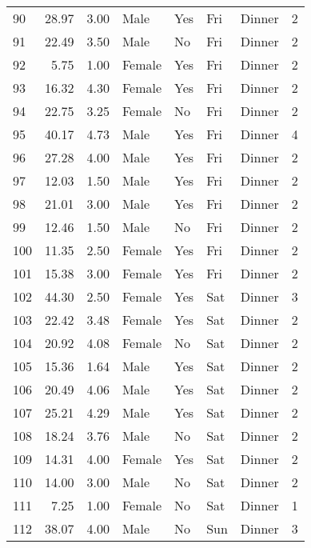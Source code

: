 \begin{tabular}{lrrllllr}
90  &       28.97 &   3.00 &    Male &    Yes &   Fri &  Dinner &     2 \\
91  &       22.49 &   3.50 &    Male &     No &   Fri &  Dinner &     2 \\
92  &        5.75 &   1.00 &  Female &    Yes &   Fri &  Dinner &     2 \\
93  &       16.32 &   4.30 &  Female &    Yes &   Fri &  Dinner &     2 \\
94  &       22.75 &   3.25 &  Female &     No &   Fri &  Dinner &     2 \\
95  &       40.17 &   4.73 &    Male &    Yes &   Fri &  Dinner &     4 \\
96  &       27.28 &   4.00 &    Male &    Yes &   Fri &  Dinner &     2 \\
97  &       12.03 &   1.50 &    Male &    Yes &   Fri &  Dinner &     2 \\
98  &       21.01 &   3.00 &    Male &    Yes &   Fri &  Dinner &     2 \\
99  &       12.46 &   1.50 &    Male &     No &   Fri &  Dinner &     2 \\
100 &       11.35 &   2.50 &  Female &    Yes &   Fri &  Dinner &     2 \\
101 &       15.38 &   3.00 &  Female &    Yes &   Fri &  Dinner &     2 \\
102 &       44.30 &   2.50 &  Female &    Yes &   Sat &  Dinner &     3 \\
103 &       22.42 &   3.48 &  Female &    Yes &   Sat &  Dinner &     2 \\
104 &       20.92 &   4.08 &  Female &     No &   Sat &  Dinner &     2 \\
105 &       15.36 &   1.64 &    Male &    Yes &   Sat &  Dinner &     2 \\
106 &       20.49 &   4.06 &    Male &    Yes &   Sat &  Dinner &     2 \\
107 &       25.21 &   4.29 &    Male &    Yes &   Sat &  Dinner &     2 \\
108 &       18.24 &   3.76 &    Male &     No &   Sat &  Dinner &     2 \\
109 &       14.31 &   4.00 &  Female &    Yes &   Sat &  Dinner &     2 \\
110 &       14.00 &   3.00 &    Male &     No &   Sat &  Dinner &     2 \\
111 &        7.25 &   1.00 &  Female &     No &   Sat &  Dinner &     1 \\
112 &       38.07 &   4.00 &    Male &     No &   Sun &  Dinner &     3 \\

\end{tabular}

